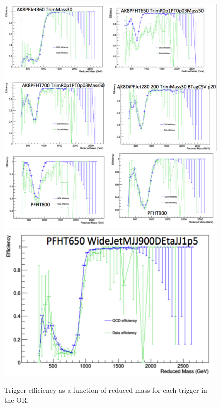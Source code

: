 \begin{figure}[thb!]
\begin{center}
\includegraphics[scale=0.35]{Figures/indTrig1.pdf}\\
\includegraphics[scale=0.35]{Figures/indTrig2.pdf}\\
\includegraphics[scale=0.35]{Figures/indTrig3.pdf}
\end{center}
\caption{Trigger efficiency as a function of reduced mass for each trigger in the OR.}
\label{fig:trigsep}
\end{figure}

